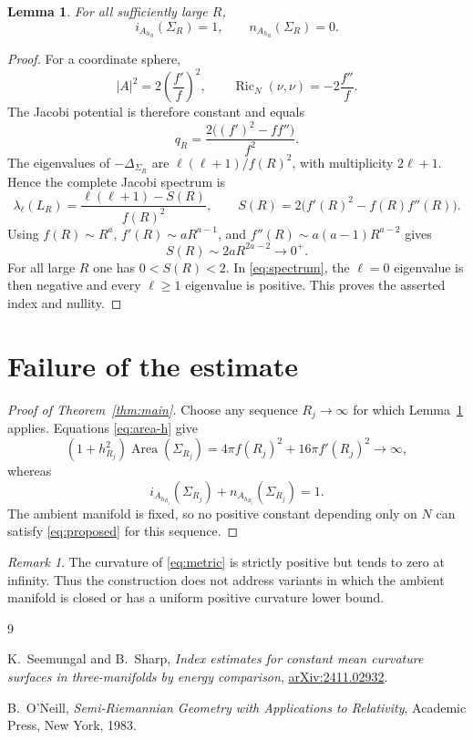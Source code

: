 \documentclass[11pt]{article}
\newtheorem{lemma}[theorem]{Lemma}
\theoremstyle{remark}
\newtheorem{remark}[theorem]{Remark}
\newcommand{\Area}{\operatorname{Area}}
\newcommand{\Ric}{\operatorname{Ric}}
\begin{document}
\begin{lemma}\label{lem:spectrum}
For all sufficiently large $R$,
\[
 i_{A_{h_R}}(\Sigma_R)=1,
 \qquad
 n_{A_{h_R}}(\Sigma_R)=0.
\]
\end{lemma}

\begin{proof}
For a coordinate sphere,
\[
 |A|^2=2\left(\frac{f'}f\right)^2,
 \qquad
 \Ric_N(\nu,\nu)=-2\frac{f''}f.
\]
The Jacobi potential is therefore constant and equals
\[
 q_R=\frac{2\bigl((f')^2-ff''\bigr)}{f^2}.
\]
The eigenvalues of $-\Delta_{\Sigma_R}$ are
$\ell(\ell+1)/f(R)^2$, with multiplicity $2\ell+1$.  Hence the complete
Jacobi spectrum is
\begin{equation}\label{eq:spectrum}
 \lambda_\ell(L_R)
 =\frac{\ell(\ell+1)-S(R)}{f(R)^2},
 \qquad
 S(R)=2\bigl(f'(R)^2-f(R)f''(R)\bigr).
\end{equation}
Using $f(R)\sim R^a$, $f'(R)\sim aR^{a-1}$, and
$f''(R)\sim a(a-1)R^{a-2}$ gives
\[
 S(R)\sim 2aR^{2a-2}\longrightarrow0^+.
\]
For all large $R$ one has $0<S(R)<2$.  In \eqref{eq:spectrum}, the
$\ell=0$ eigenvalue is then negative and every $\ell\ge1$ eigenvalue is
positive.  This proves the asserted index and nullity.
\end{proof}

\section{Failure of the estimate}

\begin{proof}[Proof of Theorem~\ref{thm:main}]
Choose any sequence $R_j\to\infty$ for which Lemma~\ref{lem:spectrum}
applies.  Equations \eqref{eq:area-h} give
\[
 (1+h_{R_j}^2)\Area(\Sigma_{R_j})
 =4\pi f(R_j)^2+16\pi f'(R_j)^2
 \longrightarrow\infty,
\]
whereas
\[
 i_{A_{h_{R_j}}}(\Sigma_{R_j})+n_{A_{h_{R_j}}}(\Sigma_{R_j})=1.
\]
The ambient manifold is fixed, so no positive constant depending only on
$N$ can satisfy \eqref{eq:proposed} for this sequence.
\end{proof}

\begin{remark}
The curvature of \eqref{eq:metric} is strictly positive but tends to zero
at infinity.  Thus the construction does not address variants in which the
ambient manifold is closed or has a uniform positive curvature lower bound.
\end{remark}

\begin{thebibliography}{9}

K.~Seemungal and B.~Sharp,
\emph{Index estimates for constant mean curvature surfaces in three-manifolds by energy comparison},
\href{https://arxiv.org/abs/2411.02932}{arXiv:2411.02932}.

B.~O'Neill,
\emph{Semi-Riemannian Geometry with Applications to Relativity},
Academic Press, New York, 1983.

\end{thebibliography}
\end{document}
